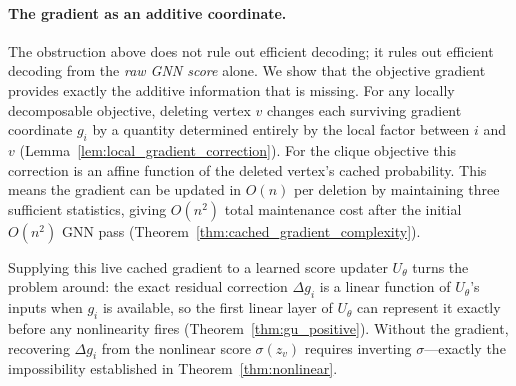 \documentclass[11pt]{article}
\theoremstyle{plain}
\theoremstyle{remark}
\begin{document}
\paragraph{The gradient as an additive coordinate.}
The obstruction above does not rule out efficient decoding; it rules out efficient
decoding from the \emph{raw GNN score} alone. We show that the objective gradient
provides exactly the additive information that is missing. For any locally
decomposable objective, deleting vertex $v$ changes each surviving gradient
coordinate $g_i$ by a quantity determined entirely by the local factor between $i$
and $v$ (Lemma~\ref{lem:local_gradient_correction}). For the clique objective this
correction is an affine function of the deleted vertex's cached probability. This
means the gradient can be updated in $O(n)$ per deletion by maintaining three
sufficient statistics, giving $O(n^2)$ total
maintenance cost after the initial $O(n^2)$ GNN pass
(Theorem~\ref{thm:cached_gradient_complexity}).

Supplying this live cached gradient to a learned score updater $U_\theta$ turns the
problem around: the exact residual correction $\Delta g_i$ is a linear function of
$U_\theta$'s inputs when $g_i$ is available, so the first linear layer of $U_\theta$
can represent it exactly before any nonlinearity fires
(Theorem~\ref{thm:gu_positive}). Without the gradient, recovering $\Delta g_i$ from
the nonlinear score $\sigma(z_{v})$ requires inverting $\sigma$---exactly the
impossibility established in Theorem~\ref{thm:nonlinear}.
\end{document}
